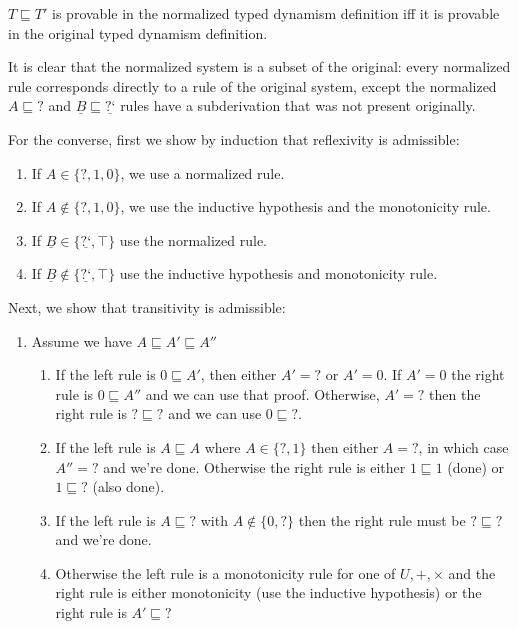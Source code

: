 \documentclass[acmsmall,screen,12pt]{acmart}
\renewcommand{\u}{\underline}
\newcommand{\ltdyn}{\sqsubseteq}
\newcommand{\dynv}{{?}}
\newcommand{\dync}{\u {\text{?`}}}
\begin{document}
\begin{longonly}
\begin{lemma}
  \label{lem:norm-type-dyn}
  $T \ltdyn T'$ is provable in the normalized typed dynamism
  definition iff it is provable in the original typed
  dynamism definition.
\end{lemma}
\begin{longproof}
It is clear that the normalized system is a subset of the original:
every normalized rule corresponds directly to a rule of the original
system, except the normalized $A \ltdyn \dynv$ and $\u B \ltdyn \dync$
rules have a subderivation that was not present originally.  

For the converse, first we show by induction that reflexivity is
admissible:
  \begin{enumerate}
  \item If $A \in \{\dynv, 1, 0\}$, we use a normalized rule.
  \item If $A \not\in\{\dynv, 1, 0\}$, we use the inductive hypothesis
    and the monotonicity rule.
  \item If $\u B\in \{\dync, \top\}$ use the normalized rule.
  \item If $\u B \not\in\{\dync, \top\}$ use the inductive hypothesis
    and monotonicity rule.
  \end{enumerate}
  Next, we show that transitivity is admissible:
  \begin{enumerate}
  \item Assume we have $A \ltdyn A' \ltdyn A''$
    \begin{enumerate}
    \item If the left rule is $0 \ltdyn A'$, then either $A' = \dynv$
      or $A' = 0$. If $A' = 0$ the right rule is $0 \ltdyn A''$ and we
      can use that proof. Otherwise, $A' = \dynv$ then the right rule
      is $\dynv \ltdyn \dynv$ and we can use $0 \ltdyn \dynv$.
    \item If the left rule is $A \ltdyn A$ where $A \in \{ \dynv, 1\}$
      then either $A = \dynv$, in which case $A'' = \dynv$ and we're
      done.  Otherwise the right rule is either $1 \ltdyn 1$ (done) or
      $1 \ltdyn \dynv$ (also done).
    \item If the left rule is $A \ltdyn \dynv$ with
      $A\not\in\{0,\dynv\}$ then the right rule must be $\dynv \ltdyn
      \dynv$ and we're done.
    \item Otherwise the left rule is a monotonicity rule for one of
      $U, +, \times$ and the right rule is either monotonicity (use
      the inductive hypothesis) or the right rule is $A' \ltdyn \dynv$

\end{enumerate}
\end{enumerate}
\end{longproof}
\end{longonly}
\end{document}
